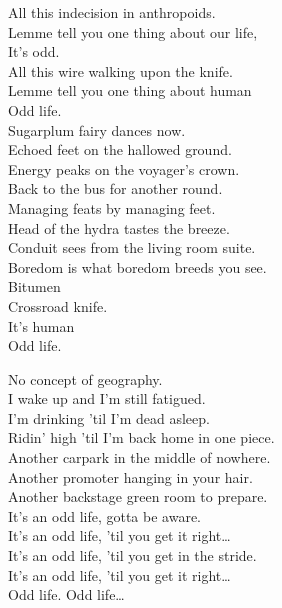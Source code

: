 All this indecision in anthropoids. \\
Lemme tell you one thing about our life, \\
It's odd. \\
All this wire walking upon the knife. \\
Lemme tell you one thing about human \\
Odd life. \\

Sugarplum fairy dances now. \\
Echoed feet on the hallowed ground. \\
Energy peaks on the voyager's crown. \\
Back to the bus for another round. \\
Managing feats by managing feet. \\
Head of the hydra tastes the breeze. \\
Conduit sees from the living room suite. \\
Boredom is what boredom breeds you see. \\

Bitumen \\
Crossroad knife. \\
It's human \\
Odd life. \\


No concept of geography. \\
I wake up and I'm still fatigued. \\
I'm drinking 'til I'm dead asleep. \\
Ridin' high 'til I'm back home in one piece. \\
Another carpark in the middle of nowhere. \\
Another promoter hanging in your hair. \\
Another backstage green room to prepare. \\
It's an odd life, gotta be aware. \\

It's an odd life, 'til you get it right… \\
It's an odd life, 'til you get in the stride. \\

It's an odd life, 'til you get it right… \\

Odd life. Odd life… \\


